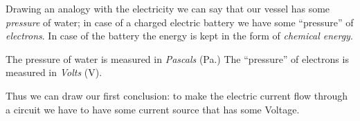\documentclass[../sparc.tex]{subfiles}
\begin{document}
Drawing an analogy with the electricity we can say that our vessel has some
\emph{pressure} of water; in case of a charged electric battery we have some
``pressure'' of \emph{electrons}.  In case of the battery the energy is kept in
the form of \emph{chemical energy}.

The pressure of water is measured in \emph{Pascals} (Pa.)  The ``pressure'' of
electrons is measured in \emph{Volts} (V).

Thus we can draw our first conclusion: to make the electric current flow through
a circuit we have to have some current source that has some Voltage.
\end{document}

